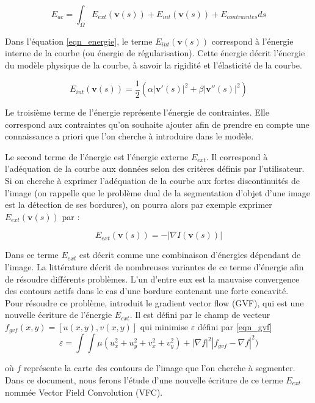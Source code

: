 \begin{equation}
E_{ac} = \int_{\Omega}{E_{ext}(\mathbf{v}(s)) + E_{int}(\mathbf{v}(s)) + E_{contraintes} ds}
\label{eqn_energie}
\end{equation}

Dans l'équation \ref{eqn_energie}, le terme $E_{int}(\mathbf{v}(s))$ correspond à l'énergie interne de la courbe (ou énergie de régularisation). Cette énergie décrit l'énergie du modèle physique de la courbe, à savoir la rigidité et l'élasticité de la courbe.

\begin{equation}
E_{int}(\mathbf{v}(s)) = \frac{1}{2}\left(\alpha|\mathbf{v}'(s)|^{2}+\beta|\mathbf{v}''(s)|^{2}\right)
\end{equation}

Le troisième terme de l'énergie représente l'énergie de contraintes. Elle correspond aux contraintes qu'on souhaite ajouter afin de prendre en compte une connaissance a priori que l'on cherche à introduire dans le modèle.

Le second terme de l'énergie est l'énergie externe $E_{ext}$. Il correspond à l'adéquation de la courbe aux données selon des critères définis par l'utilisateur. Si on cherche à exprimer l'adéquation de la courbe aux fortes discontinuités de l'image (on rappelle que le problème dual de la segmentation d'objet d'une image est la détection de ses bordures), on pourra alors par exemple exprimer $E_{ext}(\mathbf{v}(s))$ par :

\begin{equation}
E_{ext}(\mathbf{v}(s)) = -|\nabla I(\mathbf{v}(s))|
\end{equation}

Dans \cite{kaas} ce terme $E_{ext}$ est décrit comme une combinaison d'énergies dépendant de l'image. La littérature décrit de nombreuses variantes de ce terme d'énergie afin de résoudre différents problèmes. L'un d'entre eux est la mauvaise convergence des contours actifs dans le cas d'une bordure contenant une forte concavité.\\

Pour résoudre ce problème, \cite{gvf} introduit le gradient vector flow (GVF), qui est une nouvelle écriture de l'énergie $E_{ext}$. Il est défini par le champ de vecteur $f_{gvf}(x,y) = [u(x,y), v(x,y)]$ qui minimise $\varepsilon$ défini par \ref{eqn_gvf}
\begin{equation}
\varepsilon = \int\int \mu(u_{x}^{2}+u_{y}^{2}+v_{x}^{2}+v_{y}^{2})+|\nabla f|^{2}|f_{gvf}-\nabla f|^{2})
\label{eqn_gvf}
\end{equation}

où $f$ représente la carte des contours de l'image que l'on cherche à segmenter.\\

Dans ce document, nous ferons l'étude d'une nouvelle écriture de ce terme $E_{ext}$ nommée Vector Field Convolution (VFC).
